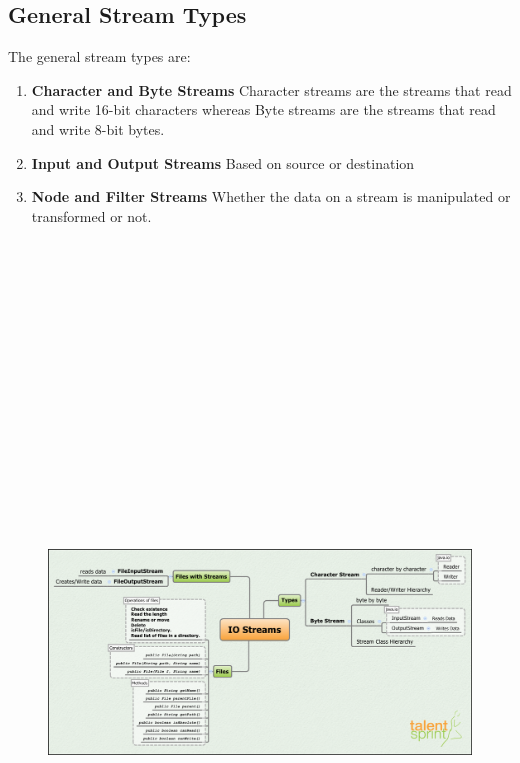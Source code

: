 \documentclass[11pt,a4paper]{article}
\begin{document}
\subsection*{General Stream Types}
The general stream types are: 
\begin{enumerate}
\item \textbf{Character and Byte Streams}
 Character streams are the streams that read and write 16-bit characters whereas Byte streams are the streams that read and write 8-bit bytes.  
\item \textbf{Input and Output Streams}
 Based on source or destination 
\item \textbf{Node and Filter Streams}
 Whether the data on a stream is manipulated or transformed or not. 
\end{enumerate}
\vfill{\ }
\begin{figure}[H]
 \begin{center}
   \includegraphics[angle=90,height=20cm, width=13cm]{IOStreams.png}
 \end{center}
 \end{figure}
\end{document}
